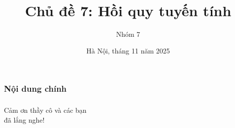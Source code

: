 \documentclass[notheorems,hyperref={bookmarks=true}]{beamer}
\title[Phân tích số liệu]{Chủ đề 7: Hồi quy tuyến tính }
\author[Nhóm 7] {Nhóm 7}
\date{Hà Nội, tháng 11 năm 2025}
\theoremstyle{plain}
\begin{document}
\begin{footnotesize} %

\begin{frame}
	\frametitle{}
	\maketitle
\end{frame}

\begin{frame}
	\frametitle{Nội dung chính}
	\tableofcontents
\end{frame}



%






\begin{frame}
	\frametitle{}
	\centering
	\Huge
	Cảm ơn thầy cô và các bạn\\đã lắng nghe!
	\vfill
\end{frame}

\end{footnotesize} %
\end{document}
